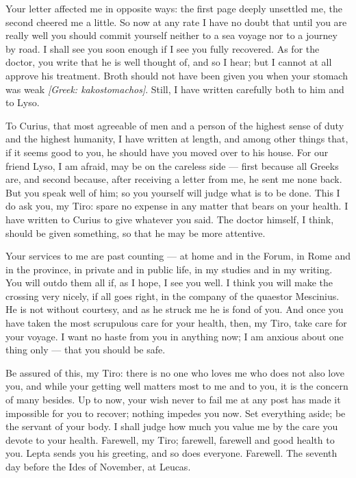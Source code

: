 

 Your letter affected me in opposite ways: the first page deeply unsettled me, the second cheered me a little. So now at any rate I have no doubt that until you are really well you should commit yourself neither to a sea voyage nor to a journey by road. I shall see you soon enough if I see you fully recovered. As for the doctor, you write that he is well thought of, and so I hear; but I cannot at all approve his treatment. Broth should not have been given you when your stomach was weak \textit{[Greek: kakostomachos]}. Still, I have written carefully both to him and to Lyso.

 To Curius, that most agreeable of men and a person of the highest sense of duty and the highest humanity, I have written at length, and among other things that, if it seems good to you, he should have you moved over to his house. For our friend Lyso, I am afraid, may be on the careless side --- first because all Greeks are, and second because, after receiving a letter from me, he sent me none back. But you speak well of him; so you yourself will judge what is to be done. This I do ask you, my Tiro: spare no expense in any matter that bears on your health. I have written to Curius to give whatever you said. The doctor himself, I think, should be given something, so that he may be more attentive.

 Your services to me are past counting --- at home and in the Forum, in Rome and in the province, in private and in public life, in my studies and in my writing. You will outdo them all if, as I hope, I see you well. I think you will make the crossing very nicely, if all goes right, in the company of the quaestor Mescinius. He is not without courtesy, and as he struck me he is fond of you. And once you have taken the most scrupulous care for your health, then, my Tiro, take care for your voyage. I want no haste from you in anything now; I am anxious about one thing only --- that you should be safe.

 Be assured of this, my Tiro: there is no one who loves me who does not also love you, and while your getting well matters most to me and to you, it is the concern of many besides. Up to now, your wish never to fail me at any post has made it impossible for you to recover; nothing impedes you now. Set everything aside; be the servant of your body. I shall judge how much you value me by the care you devote to your health. Farewell, my Tiro; farewell, farewell and good health to you. Lepta sends you his greeting, and so does everyone. Farewell. The seventh day before the Ides of November, at Leucas.
